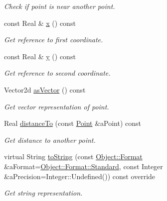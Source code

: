 \begin{DoxyCompactItemize}
\begin{DoxyCompactList}\small\item\em Check if point is near another point. \end{DoxyCompactList}\item 
const Real \& \hyperlink{classlibrary_1_1math_1_1geom_1_1d2_1_1objects_1_1_point_abaaa09e58c97324a44e9d60bcad63171}{x} () const
\begin{DoxyCompactList}\small\item\em Get reference to first coordinate. \end{DoxyCompactList}\item 
const Real \& \hyperlink{classlibrary_1_1math_1_1geom_1_1d2_1_1objects_1_1_point_a088e03daba1ed10a0a3e575ffd1d82fa}{y} () const
\begin{DoxyCompactList}\small\item\em Get reference to second coordinate. \end{DoxyCompactList}\item 
Vector2d \hyperlink{classlibrary_1_1math_1_1geom_1_1d2_1_1objects_1_1_point_a570cc81d15674537baa36e0e1b251612}{as\+Vector} () const
\begin{DoxyCompactList}\small\item\em Get vector representation of point. \end{DoxyCompactList}\item 
Real \hyperlink{classlibrary_1_1math_1_1geom_1_1d2_1_1objects_1_1_point_a1615c904b4f5a1c406cdba97df6445d8}{distance\+To} (const \hyperlink{classlibrary_1_1math_1_1geom_1_1d2_1_1objects_1_1_point}{Point} \&a\+Point) const
\begin{DoxyCompactList}\small\item\em Get distance to another point. \end{DoxyCompactList}\item 
virtual String \hyperlink{classlibrary_1_1math_1_1geom_1_1d2_1_1objects_1_1_point_ae645a37f426dac123d566fb5511d595d}{to\+String} (const \hyperlink{classlibrary_1_1math_1_1geom_1_1d2_1_1_object_ac8cd61dada4960cfee9a469231621b17}{Object\+::\+Format} \&a\+Format=\hyperlink{classlibrary_1_1math_1_1geom_1_1d2_1_1_object_ac8cd61dada4960cfee9a469231621b17aeb6d8ae6f20283755b339c0dc273988b}{Object\+::\+Format\+::\+Standard}, const Integer \&a\+Precision=Integer\+::\+Undefined()) const override
\begin{DoxyCompactList}\small\item\em Get string representation. \end{DoxyCompactList}\item 

\end{DoxyCompactItemize}
